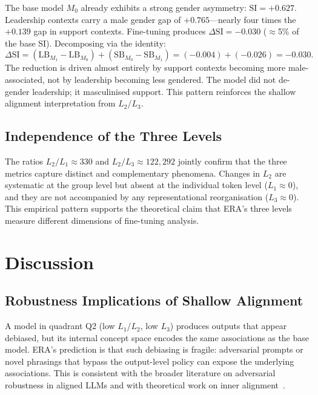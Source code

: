 \documentclass[11pt,a4paper]{article}
\newcommand{\M}[1]{M_{#1}}           %
\newcommand{\DeltaSI}{\Delta\mathrm{SI}}
\begin{document}
The base model $\M{0}$ already exhibits a strong gender asymmetry: $\mathrm{SI} = +0.627$.
Leadership contexts carry a male gender gap of $+0.765$---nearly four times the $+0.139$
gap in support contexts. Fine-tuning produces $\DeltaSI = -0.030$ ($\approx$5\% of the
base SI). Decomposing via the identity:
\[
  \DeltaSI = (\mathrm{LB}_{\M{1}} - \mathrm{LB}_{\M{0}})
           + (\mathrm{SB}_{\M{0}} - \mathrm{SB}_{\M{1}})
           = (-0.004) + (-0.026) = -0.030.
\]
The reduction is driven almost entirely by support contexts becoming more male-associated,
not by leadership becoming less gendered. The model did not de-gender leadership; it
masculinised support. This pattern reinforces the shallow alignment interpretation from
$L_2/L_3$.

\subsection{Independence of the Three Levels}

The ratios $L_2/L_1 \approx 330$ and $L_2/L_3 \approx 122{,}292$ jointly confirm that
the three metrics capture distinct and complementary phenomena. Changes in $L_2$ are
systematic at the group level but absent at the individual token level ($L_1 \approx 0$),
and they are not accompanied by any representational reorganisation ($L_3 \approx 0$).
This empirical pattern supports the theoretical claim that ERA's three levels measure
different dimensions of fine-tuning analysis.

\section{Discussion}
\label{sec:discussion}

\subsection{Robustness Implications of Shallow Alignment}

A model in quadrant Q2 (low $L_1$/$L_2$, low $L_3$) produces outputs that appear
debiased, but its internal concept space encodes the same associations as the base model.
ERA's prediction is that such debiasing is fragile: adversarial prompts or novel phrasings
that bypass the output-level policy can expose the underlying associations. This is
consistent with the broader literature on adversarial robustness in aligned LLMs and
with theoretical work on inner alignment~\cite{hubinger2019}.
\end{document}
